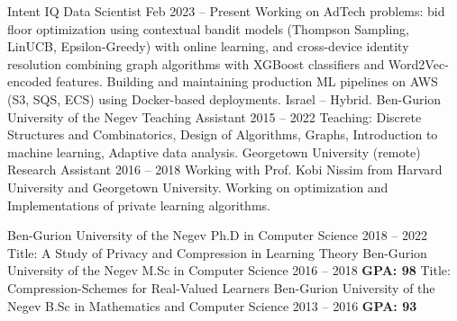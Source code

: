 \documentclass[]{awesome-cv}
\begin{document}
\begin{cventries}
	\cventry
	{Intent IQ}
	{Data Scientist}
	{Feb 2023 – Present}
	{}
    {Working on AdTech problems: bid floor optimization using contextual bandit models (Thompson Sampling, LinUCB, Epsilon-Greedy) with online learning, and cross-device identity resolution combining graph algorithms with XGBoost classifiers and Word2Vec-encoded features. Building and maintaining production ML pipelines on AWS (S3, SQS, ECS) using Docker-based deployments. Israel – Hybrid.}
	\cventry
	{Ben-Gurion University of the Negev}
	{Teaching Assistant}
	{2015 – 2022}
	{}
    {Teaching: Discrete Structures and Combinatorics, Design of Algorithms, Graphs, \hspace{20em} Introduction to machine learning, Adaptive data analysis.}	
	\cventry
	{Georgetown University (remote)}
	{Research Assistant}
	{2016 – 2018}
	{}
    {Working with Prof. Kobi Nissim from Harvard University and Georgetown University. \hspace{20em}
    Working on optimization and Implementations of private learning algorithms.}
\end{cventries}
\vspace{-2mm}
\begin{cventries}
	\cventry
	{Ben-Gurion University of the Negev}
	{Ph.D in Computer Science}
	{2018 – 2022}
	{}
	{Title: A Study of Privacy and Compression in Learning Theory}
	\cventry
	{Ben-Gurion University of the Negev}
	{M.Sc in Computer Science}	
    {2016 – 2018}
	{\textbf{GPA: 98}}	    
	{Title: Compression-Schemes for Real-Valued Learners}	
	\cventry
	{Ben-Gurion University of the Negev}	
	{B.Sc in Mathematics and Computer Science}
	{2013 – 2016}
	{\textbf{GPA: 93}}
    {}
\end{cventries}

\vspace{-5mm}
\end{document}
